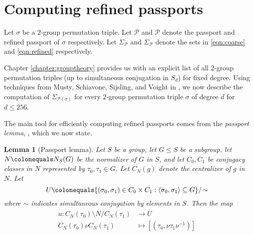 \documentclass{dcthesis}
\newcommand{\wt}[1]{\widetilde{#1}}
\numberwithin{equation}{section}
\newtheorem{lemma}[equation]{Lemma}
\theoremstyle{definition}
\theoremstyle{remark}
\begin{document}
{{  \section{Computing refined passports}{
    \label{sec:computerefined}
    Let $\sigma$ be a $2$-group permutation triple.
    Let $\mathcal{P}$ and $\mathscr{P}$ denote the
    passport and refined passport of $\sigma$
    respectively.
    Let
    $\Sigma_\mathcal{P}$ and $\Sigma_\mathscr{P}$
    denote the sets in
    \eqref{eqn:coarse}
    and
    \eqref{eqn:refined}
    respectively.
    \par
    Chapter \ref{chapter:grouptheory}
    provides us with an explicit list
    of all $2$-group permutation triples
    (up to simultaneous conjugation in $S_d$)
    for fixed degree.
    Using techniques from
    Musty, Schiavone, Sijsling, and Voight
    in \cite{belyidb},
    we now describe the computation
    of $\Sigma_{\mathscr{P}(\sigma)}$ for
    every $2$-group permutation triple
    $\sigma$ of degree $d$ for $d\leq 256$.
    \par
    The main tool for efficiently computing refined
    passports comes from
    the \emph{passport lemma},
    \cite[Lemma 2.2.1]{belyidb},
    which we now state.
    \begin{lemma}[Passport lemma]
      \label{lem:passportlemma}
      Let $S$ be a group,
      let $G\leq S$ be a subgroup,
      let $N\colonequals N_S(G)$
      be the normalizer of $G$ in $S$,
      and let $C_0,C_1$ be conjugacy classes
      in $N$ represented by
      $\tau_0,\tau_1\in G$.
      Let $C_N(g)$ denote the centralizer of
      $g$ in $N$.
      Let
      \begin{equation}
        \label{eqn:passportlemmaU}
        U\colonequals
        \{
          (\sigma_0,\sigma_1)\in C_0\times C_1 :
          \langle\sigma_0,\sigma_1\rangle
          \subseteq G
        \}
        /\!\sim
      \end{equation}
      where $\sim$ indicates simultaneous
      conjugation by elements in $S$.
      Then the map
      \begin{align}
        \label{eqn:passportlemmau}
        \begin{split}
          u\colon C_N(\tau_0)\!\setminus\!N/C_N(\tau_1)&\to U\\
          C_N(\tau_0)\nu C_N(\tau_1)&\mapsto
          [(\tau_0,\nu\tau_1\nu^{-1})]
        \end{split}

\end{align}
\end{lemma}}}}
\end{document}
